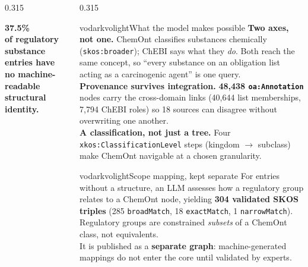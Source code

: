 \documentclass[final]{beamer}
\newlength{\colh}
\begin{document}
\begin{frame}[t]
\begin{columns}[t,onlytextwidth]
\begin{column}{0.315\textwidth}
\begin{minipage}[t][\colh][s]{\linewidth}
\vfill
\begin{callout}
  {\fontsize{86}{92}\selectfont\bfseries\color{vodark}37.5\%}\\[5mm]
  {\fontsize{29}{36}\selectfont\bfseries\color{vodark}
   of regulatory substance entries have no machine-readable structural
   identity.}
\end{callout}

\end{minipage}
\end{column}

\begin{column}{0.315\textwidth}
\begin{minipage}[t][\colh][s]{\linewidth}
\rule{0pt}{0pt}%
\begin{pbox}{vodark}{volight}{What the model makes possible}
  \justifying
  \textbf{Two axes, not one.} ChemOnt classifies substances chemically
  (\texttt{skos:broader}); ChEBI says what they \emph{do}. Both reach the same
  concept, so ``every substance on an obligation list acting as a carcinogenic
  agent'' is one query.\\[4mm]
  \textbf{Provenance survives integration.} \textbf{48,438
  \texttt{oa:Annotation}} nodes carry the cross-domain links (40,644 list
  memberships, 7,794 ChEBI roles) so 18 sources can disagree without
  overwriting one another.\\[4mm]
  \textbf{A classification, not just a tree.} Four
  \texttt{xkos:ClassificationLevel} steps (kingdom $\rightarrow$ subclass) make
  ChemOnt navigable at a chosen granularity.
\end{pbox}

\vfill
\begin{pbox}{vodark}{volight}{Scope mapping, kept separate}
  \justifying
  For entries without a structure, an LLM assesses how a regulatory group
  relates to a ChemOnt node, yielding \textbf{304 validated SKOS triples}
  (285 \texttt{broadMatch}, 18 \texttt{exactMatch}, 1 \texttt{narrowMatch}).
  Regulatory groups are constrained \emph{subsets} of a ChemOnt class, not
  equivalents.\\[5mm]
  It is published as a \textbf{separate graph}: machine-generated mappings do
  not enter the core until validated by experts.
\end{pbox}


\end{minipage}
\end{column}
\end{columns}
\end{frame}
\end{document}
